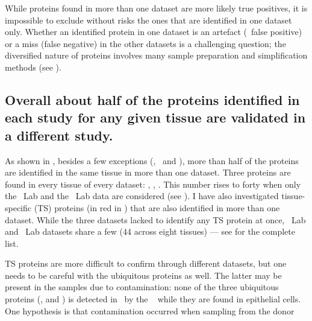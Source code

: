 While proteins found in more than one dataset are more likely true positives,
it is impossible to exclude without risks the ones
that are identified in one dataset only.
Whether an identified protein in one dataset is
an artefact (\ie\ false positive) or a miss (false negative) in the other datasets
is a challenging question;
the diversified nature of proteins involves
many sample preparation and simplification methods
(see ).\mybr\



\subsection{Overall about half of the proteins identified
in each study for any given tissue
are validated in a different study.}\label{subsec:halfProtConfirmed}

As shown in ,
besides a few exceptions (\oesophagus, \gall\ and \testis),
more than half of the proteins are identified in the same tissue
in more than one dataset.
Three proteins are found in every tissue of every dataset:
,  , .
This number rises to forty when only the \pandey\ Lab and the \kuster\ Lab data
are considered (see ).
I have also investigated tissue-specific (\gls{TS}) proteins
(in red in )
that are also identified in more than one dataset.
While the three datasets lacked to identify any \gls{TS} protein at once,
\pandey\ Lab and \kuster\ Lab datasets share a few (44 across eight tissues)
--- see  for the complete list.\mybr\
\begin{comment}
twelve for \kidney, nine for \placenta, seven for \pancreas,
five for \adrenal\ and \liver, four for \testis,
and one for \prostate\ and \rectum.
\end{comment}

\gls{TS} proteins are more difficult to confirm
through different datasets,
but one needs to be careful with the ubiquitous proteins as well.
The latter may be present in the samples due to contamination:
none of the three ubiquitous proteins
(,   and )
is detected in \heart\ by the
~
while they are found in epithelial cells.
One hypothesis is that contamination occurred when sampling from the donor
\mybr\

